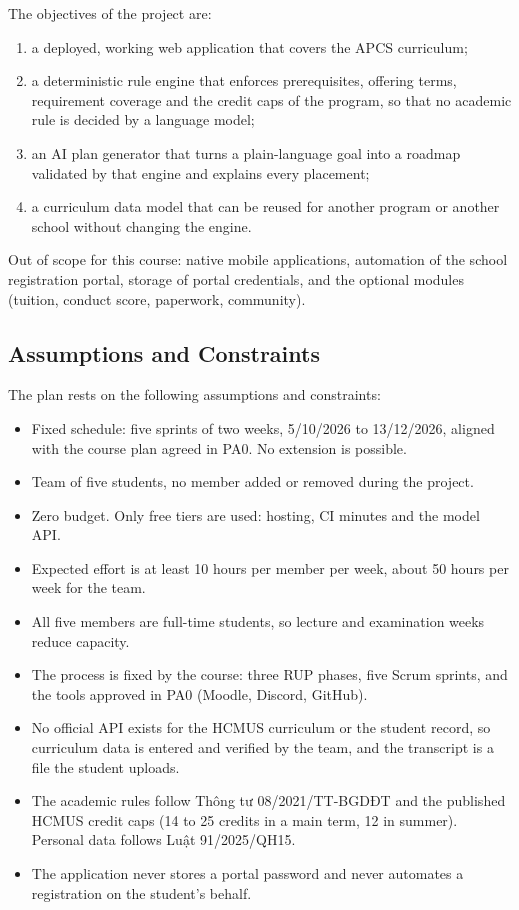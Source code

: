 \documentclass{article}
\begin{document}
The objectives of the project are:

\begin{enumerate}
  \item a deployed, working web application that covers the APCS curriculum;
  \item a deterministic rule engine that enforces prerequisites, offering terms, requirement coverage and the credit caps
        of the program, so that no academic rule is decided by a language model;
  \item an AI plan generator that turns a plain-language goal into a roadmap validated by that engine and explains every
        placement;
  \item a curriculum data model that can be reused for another program or another school without changing the engine.
\end{enumerate}

Out of scope for this course: native mobile applications, automation of the school registration portal, storage of portal
credentials, and the optional modules (tuition, conduct score, paperwork, community).

\subsection{Assumptions and Constraints}
The plan rests on the following assumptions and constraints:

\begin{itemize}
  \item Fixed schedule: five sprints of two weeks, 5/10/2026 to 13/12/2026, aligned with the course plan agreed in PA0.
        No extension is possible.
  \item Team of five students, no member added or removed during the project.
  \item Zero budget. Only free tiers are used: hosting, CI minutes and the model API.
  \item Expected effort is at least 10 hours per member per week, about 50 hours per week for the team.
  \item All five members are full-time students, so lecture and examination weeks reduce capacity.
  \item The process is fixed by the course: three RUP phases, five Scrum sprints, and the tools approved in PA0
        (Moodle, Discord, GitHub).
  \item No official API exists for the HCMUS curriculum or the student record, so curriculum data is entered and verified
        by the team, and the transcript is a file the student uploads.
  \item The academic rules follow Thông tư 08/2021/TT-BGDĐT and the published HCMUS credit caps (14 to 25 credits in a
        main term, 12 in summer). Personal data follows Luật 91/2025/QH15.
  \item The application never stores a portal password and never automates a registration on the student's behalf.
\end{itemize}
\end{document}
